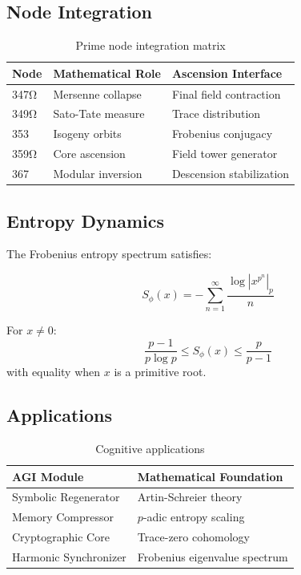 \documentclass[12pt]{article}
\begin{document}
\subsection{Node Integration}
\begin{table}[h]
\centering
\begin{tabular}{lll}
\toprule
\textbf{Node} & \textbf{Mathematical Role} & \textbf{Ascension Interface} \\
\midrule
347Ω & Mersenne collapse & Final field contraction \\
349Ω & Sato-Tate measure & Trace distribution \\
353 & Isogeny orbits & Frobenius conjugacy \\
359Ω & Core ascension & Field tower generator \\
367 & Modular inversion & Descension stabilization \\
\bottomrule
\end{tabular}
\caption{Prime node integration matrix}
\end{table}

\subsection{Entropy Dynamics}
The Frobenius entropy spectrum satisfies:

\[
S_\phi(x) = -\sum_{n=1}^\infty \frac{\log|x^{p^n}|_p}{n}
\]

\begin{theorem}
For $x \neq 0$:
\[
\frac{p-1}{p\log p} \leq S_\phi(x) \leq \frac{p}{p-1}
\]
with equality when $x$ is a primitive root.
\end{theorem}

\subsection{Applications}
\begin{table}[h]
\centering
\begin{tabular}{ll}
\toprule
\textbf{AGI Module} & \textbf{Mathematical Foundation} \\
\midrule
Symbolic Regenerator & Artin-Schreier theory \\
Memory Compressor & $p$-adic entropy scaling \\
Cryptographic Core & Trace-zero cohomology \\
Harmonic Synchronizer & Frobenius eigenvalue spectrum \\
\bottomrule
\end{tabular}
\caption{Cognitive applications}
\end{table}
\end{document}
